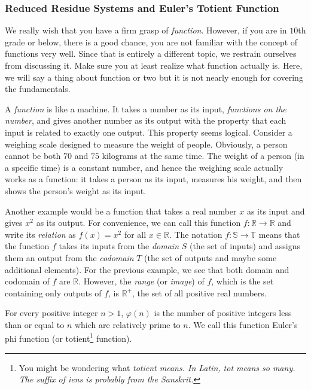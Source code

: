 \documentclass{subfile}
\begin{document}
	\subsubsection{Reduced Residue Systems and Euler's Totient Function} 
	We really wish that you have a firm grasp of \textit{function}. However, if you are in $10$th grade or below, there is a good chance, you are not familiar with the concept of functions very well. Since that is entirely a different topic, we restrain ourselves from discussing it. Make sure you at least realize what function actually is. Here, we will say a thing about function or two but it is not nearly enough for covering the fundamentals.
	
	A \textit{function} is like a machine. It takes a number as its input, \textit{functions on the number}, and gives another number as its output with the property that each input is related to exactly one output. This property seems logical. Consider a weighing scale designed to measure the weight of people. Obviously, a person cannot be both $70$ and $75$ kilograms at the same time. The weight of a person (in a specific time) is a constant number, and hence the weighing scale actually works as a function: it takes a person as its input, measures his weight, and then shows the person's weight as its input. 
	
	Another example would be a function that takes a real number $x$ as its input and gives $x^2$ as its output. For convenience, we can call this function $f: \mathbb R \to \mathbb R$ and write its \textit{relation} as $f(x) = x^2$ for all $x \in \mathbb R$. The notation $f: \mathbb S \to \mathbb T$ means that the function $f$ takes its inputs from the \textit{domain} $S$ (the set of inputs) and assigns them an output from the \textit{codomain} $T$ (the set of outputs and maybe some additional elements). For the previous example, we see that both domain and codomain of $f$ are $\mathbb R$. However, the \textit{range} (or \textit{image}) of $f$, which is the set containing only outputs of $f$, is $\mathbb R^{+}$, the set of all positive real numbers.
	
	\begin{definition}\label{def:totient} 
		For every positive integer $n>1$, $\varphi(n)$ is the number of positive integers less than or equal to $n$ which are relatively prime to $n$. We call this function Euler's phi function (or totient\footnote{You might be wondering what \slshape{totient} means. In Latin, \slshape{tot} means so many. The suffix of \slshape{iens} is probably from the Sanskrit.} function).
	\end{definition}
	
\end{document}
